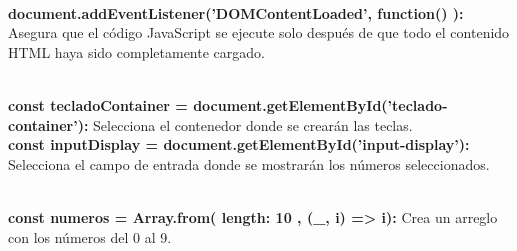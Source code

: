 \documentclass{article}
\begin{document}
\\\textbf{document.addEventListener('DOMContentLoaded', function() ):} Asegura que el código JavaScript se ejecute solo después de que todo el contenido HTML haya sido completamente cargado.

\\\textbf{const tecladoContainer = document.getElementById('teclado-container'):} Selecciona el contenedor donde se crearán las teclas.
\\\textbf{const inputDisplay = document.getElementById('input-display'):} Selecciona el campo de entrada donde se mostrarán los números seleccionados.

\\\textbf{const numeros = Array.from({ length: 10 }, (_, i) => i):} Crea un arreglo con los números del 0 al 9.
\end{document}
